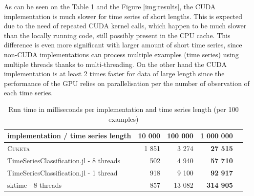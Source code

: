\documentclass{article}
\newcommand\CUKETA{\textsc{Cuketa}\xspace}
\newcommand{\emjl}[1]{\raisebox{-1.5pt}{\large\texttwemoji{#1}}}
\newcommand\unuglifytable{\centering\renewcommand{\arraystretch}{1.5}}
\begin{document}
As can be seen on the Table \ref{tab:results} and the Figure \ref{img:results}, the CUDA implementation is much slower for time series of short lengths. This is expected due to the need of repeated CUDA kernel calls, which happen to be much slower than the locally running code, still possibly present in the CPU cache. This difference is even more significant with larger amount of short time series, since non-CUDA implementations can process multiple examples (time series) using multiple threads thanks to multi-threading. On the other hand the CUDA implementation is at least 2 times faster for data of large length since the performance of the GPU relies on parallelisation per the number of observation of each time series.

\begin{table}[!h]
\unuglifytable
\begin{tabular}{l|rrrr}
implementation / time series length     & 10 000                     & 100 000                      & \textbf{1 000 000}                     \\
\hline
\CUKETA~\emjl{zucchini}                  & 1 851                      & \textcolor{VioletRed}{3 274} & \textcolor{VioletRed}{\textbf{27 515}} \\
TimeSeriesClassification.jl - 8 threads & \textcolor{VioletRed}{502} & 4 940                        & \textbf{57 710}                        \\
TimeSeriesClassification.jl - 1 thread  & 918                        & 9 100                        & \textbf{92 917}                        \\
sktime - 8 threads                      & 857                        & 13 082                       & \textbf{314 905}
\end{tabular}
\caption{Run time in milliseconds per implementation and time series length (per 100 examples)}\label{tab:results}
\end{table}
\end{document}
